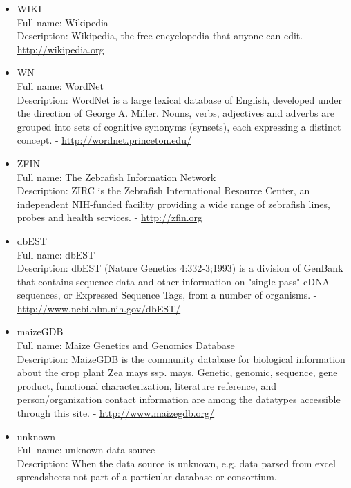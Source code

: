 \begin{itemize}
\item{WIKI}\\ Full name: Wikipedia\\ Description: Wikipedia, the free encyclopedia that anyone can edit. - 
\url{http://wikipedia.org}

\item{WN}\\ Full name: WordNet\\ Description: WordNet is a large lexical database of English, developed under the direction of George A. Miller. Nouns, verbs, adjectives and adverbs are grouped into sets of cognitive synonyms (synsets), each expressing a distinct concept. - 
\url{http://wordnet.princeton.edu/}

\item{ZFIN}\\ Full name: The Zebrafish Information Network\\ Description: ZIRC is the Zebrafish International Resource Center, an independent NIH-funded facility providing a wide range of zebrafish lines, probes and health services. - 
\url{http://zfin.org}

\item{dbEST}\\ Full name: dbEST\\ Description: dbEST (Nature Genetics 4:332-3;1993) is a division of GenBank that contains sequence data and other information on "single-pass" cDNA sequences, or Expressed Sequence Tags, from a number of organisms. - 
\url{http://www.ncbi.nlm.nih.gov/dbEST/}

\item{maizeGDB}\\ Full name: Maize Genetics and Genomics Database\\ Description: MaizeGDB is the community database for biological information about the crop plant Zea mays ssp. mays. Genetic, genomic, sequence, gene product, functional characterization, literature reference, and person/organization contact information are among the datatypes accessible through this site. - 
\url{http://www.maizegdb.org/}

\item{unknown}\\ Full name: unknown data source\\ Description: When the data source is unknown, e.g. data parsed from excel spreadsheets not part of a particular database or consortium. 

\end{itemize}
